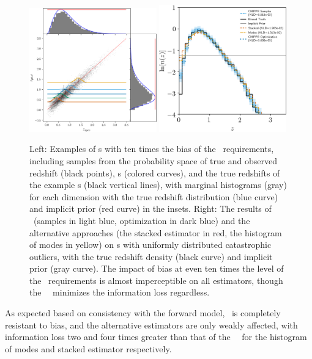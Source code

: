 \begin{figure}
	\includegraphics[width=0.49\textwidth]{figures/chippr/thesis_neghibias_mega_scatter.png}
	\includegraphics[width=0.49\textwidth]{figures/chippr/thesis_neghibias_log_estimators.png}
	\caption{
		Left: Examples of \pzpdf s with ten times the bias of the \lsst\ requirements, including samples from the probability space of true and observed redshift (black points), \pzpdf s (colored curves), and the true redshifts of the example \pzpdf s (black vertical lines), with marginal histograms (gray) for each dimension with the true redshift distribution (blue curve) and implicit prior (red curve) in the insets.
		Right: The results of \Chippr\ (samples in light blue, optimization in dark blue) and the alternative approaches (the stacked estimator in red, the histogram of modes in yellow) on \pzpdf s with uniformly distributed catastrophic outliers, with the true redshift density (black curve) and implicit prior (gray curve).
		The impact of bias at even ten times the level of the \lsst\ requirements is almost imperceptible on all estimators, though the \Chippr\ \mmle\ minimizes the information loss regardless.
	}
\end{figure}

As expected based on consistency with the forward model, \Chippr\ is completely resistant to bias, and the alternative estimators are only weakly affected, with information loss two and four times greater than that of the \Chippr\ \mmle\ for the histogram of modes and stacked estimator respectively.

